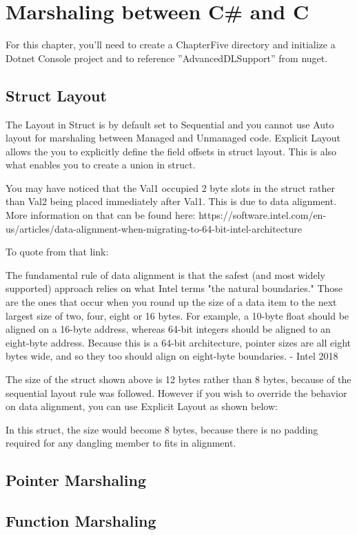 \chapter{Marshaling between C\# and C}
For this chapter, you'll need to create a ChapterFive directory and initialize a Dotnet Console project and to reference ''AdvancedDLSupport'' from nuget.

\section{Struct Layout}
The Layout in Struct is by default set to Sequential and you cannot use Auto layout for marshaling between Managed and Unmanaged code. Explicit Layout allows the you to explicitly define the field offsets in struct layout. This is also what enables you to  create a union in struct.



You may have noticed that the Val1 occupied 2 byte slots in the struct rather than Val2 being placed immediately after Val1. This is due to data alignment.  More information on that can be found here: https://software.intel.com/en-us/articles/data-alignment-when-migrating-to-64-bit-intel-architecture

To quote from that link:

\begin{coloredbox}
	The fundamental rule of data alignment is that the safest (and most widely supported) approach relies on what Intel terms "the natural boundaries." Those are the ones that occur when you round up the size of a data item to the next largest size of two, four, eight or 16 bytes. For example, a 10-byte float should be aligned on a 16-byte address, whereas 64-bit integers should be aligned to an eight-byte address. Because this is a 64-bit architecture, pointer sizes are all eight bytes wide, and so they too should align on eight-byte boundaries. - Intel 2018
\end{coloredbox}

The size of the struct shown above is 12 bytes rather than 8 bytes, because of the sequential layout rule was followed. However if you wish to override the behavior on data alignment, you can use Explicit Layout as shown below:
\newpage


In this struct, the size would become 8 bytes, because there is no padding required for any dangling member to fits in alignment.
\section{Pointer Marshaling}

\section{Function Marshaling}

